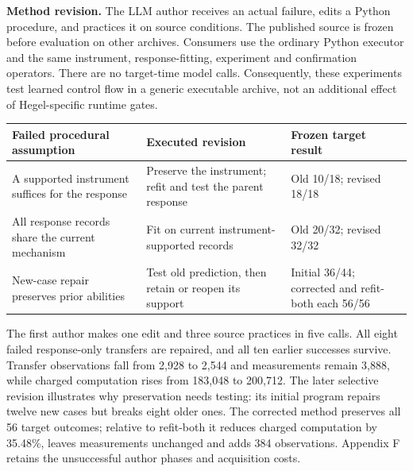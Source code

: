 \documentclass[11pt,a4paper]{article}
\begin{document}
\textbf{Method revision.} The LLM author receives an actual failure, edits a Python procedure, and practices it on source conditions. The published source is frozen before evaluation on other archives. Consumers use the ordinary  Python executor and the same instrument, response-fitting, experiment and confirmation operators. There are no target-time model calls. Consequently, these experiments test learned control flow in a generic executable archive, not an additional effect of Hegel-specific runtime gates.


\begingroup\small\setlength{\tabcolsep}{4pt}
\renewcommand{\arraystretch}{1.18}
\par\addvspace{.7em}\noindent\begin{minipage}{\linewidth}
\begin{tabular}{@{}>{\raggedright\arraybackslash}p{}>{\raggedright\arraybackslash}p{}>{\raggedright\arraybackslash}p{}@{}}
\toprule
\textbf{Failed procedural assumption} & \textbf{Executed revision} & \textbf{Frozen target result} \\
\midrule
A supported instrument suffices for the response & Preserve the instrument; refit and test the parent response & Old 10/18; revised 18/18 \\
All response records share the current mechanism & Fit on current instrument-supported records & Old 20/32; revised 32/32 \\
New-case repair preserves prior abilities & Test old prediction, then retain or reopen its support & Initial 36/44; corrected and refit-both each 56/56 \\
\bottomrule
\end{tabular}
\end{minipage}\par\addvspace{.7em}
\endgroup

The first author makes one edit and three source practices in five calls. All eight failed response-only transfers are repaired, and all ten earlier successes survive. Transfer observations fall from 2,928 to 2,544 and measurements remain 3,888, while charged computation rises from 183,048 to 200,712. The later selective revision illustrates why preservation needs testing: its initial program repairs twelve new cases but breaks eight older ones. The corrected method preserves all 56 target outcomes; relative to refit-both it reduces charged computation by 35.48\%, leaves measurements unchanged and adds 384 observations. Appendix F retains the unsuccessful author phases and acquisition costs.
\end{document}
